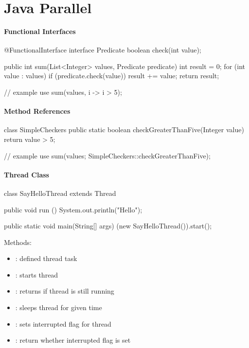 \section{Java Parallel}

\paragraph{Functional Interfaces}
\begin{java}
  @FunctionalInterface
  interface Predicate {
    boolean check(int value);
  }

  public int sum(List<Integer> values, Predicate predicate) {
    int result = 0;
    for (int value : values) {
      if (predicate.check(value)) result += value;
    }
    return result;
  }

  // example use
  sum(values, i -> i > 5);
\end{java}

\paragraph{Method References}
\begin{java}
  class SimpleCheckers {
    public static boolean checkGreaterThanFive(Integer value) {
      return value > 5;
    }
  }

  // example use
  sum(values; SimpleCheckers::checkGreaterThanFive);
\end{java}

\paragraph{Thread Class}
\begin{java}
  class SayHelloThread extends Thread {
    public void run () {
      System.out.println("Hello");
    }

    public static void main(String[] args) {
      (new SayHelloThread()).start();
    }
  }
\end{java}
Methods:
\begin{itemize}
  \item {}: defined thread task
  \item {}: starts thread
  \item {}: returns if thread is still running
  \item {}: sleeps thread for given time
  \item {}: sets interrupted flag for thread
  \item {}: return whether interrupted flag is set
\end{itemize}

